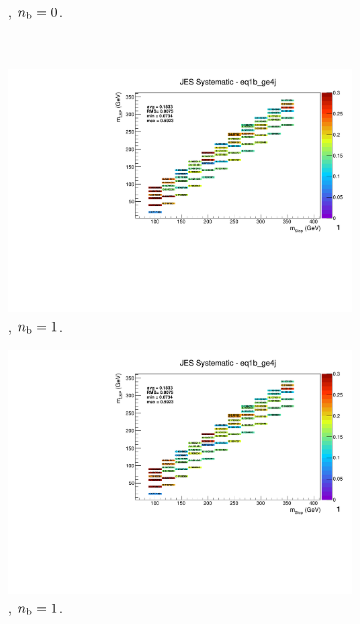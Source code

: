 \begin{figure}[ht!]
\begin{subfigure}[b]{0.32\textwidth}
    \caption{\njhigh, $n_{\text{b}} = 0$.}
    \label{fig:sms-jes-t2cc-ge4j-0b}
  \end{subfigure}\\
  \begin{subfigure}[b]{0.32\textwidth}
    \includegraphics[width=\textwidth, page=12]{Figs/sms/t2cc/v37/systs_v2/T2cc_JES_eq1b_ge4j.pdf}
    \caption{\njhigh, $n_{\text{b}} = 1$.}
  \end{subfigure}
  \begin{subfigure}[b]{0.32\textwidth}
    \includegraphics[width=\textwidth, page=8]{Figs/sms/t2cc/v37/systs_v2/T2cc_JES_eq1b_ge4j.pdf}
    \caption{\njhigh, $n_{\text{b}} = 1$.}
  \end{subfigure}
  \begin{subfigure}[b]{0.32\textwidth}

\end{subfigure}
\end{figure}
